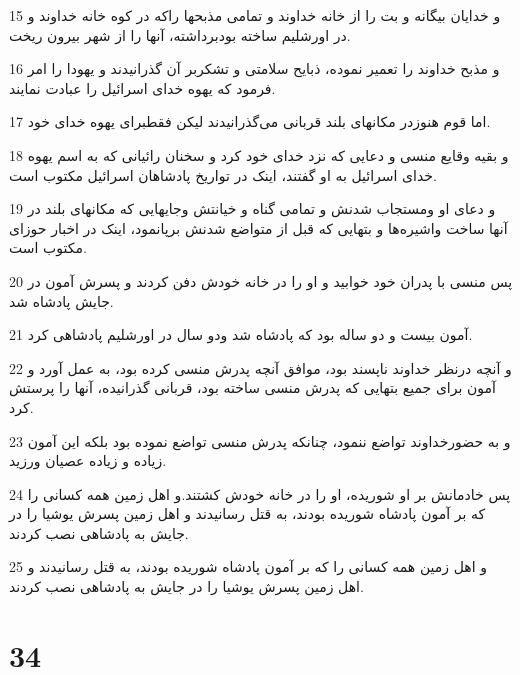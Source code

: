 \par 15 و خدایان بیگانه و بت را از خانه خداوند و تمامی مذبحها راکه در کوه خانه خداوند و در اورشلیم ساخته بودبرداشته، آنها را از شهر بیرون ریخت.
\par 16 و مذبح خداوند را تعمیر نموده، ذبایح سلامتی و تشکربر آن گذرانیدند و یهودا را امر فرمود که یهوه خدای اسرائیل را عبادت نمایند.
\par 17 اما قوم هنوزدر مکانهای بلند قربانی می‌گذرانیدند لیکن فقطبرای یهوه خدای خود.
\par 18 و بقیه وقایع منسی و دعایی که نزد خدای خود کرد و سخنان رائیانی که به اسم یهوه خدای اسرائیل به او گفتند، اینک در تواریخ پادشاهان اسرائیل مکتوب است.
\par 19 و دعای او ومستجاب شدنش و تمامی گناه و خیانتش وجایهایی که مکانهای بلند در آنها ساخت واشیره‌ها و بتهایی که قبل از متواضع شدنش برپانمود، اینک در اخبار حوزای مکتوب است.
\par 20 پس منسی با پدران خود خوابید و او را در خانه خودش دفن کردند و پسرش آمون در جایش پادشاه شد.
\par 21 آمون بیست و دو ساله بود که پادشاه شد ودو سال در اورشلیم پادشاهی کرد.
\par 22 و آنچه درنظر خداوند ناپسند بود، موافق آنچه پدرش منسی کرده بود، به عمل آورد و آمون برای جمیع بتهایی که پدرش منسی ساخته بود، قربانی گذرانیده، آنها را پرستش کرد.
\par 23 و به حضورخداوند تواضع ننمود، چنانکه پدرش منسی تواضع نموده بود بلکه این آمون زیاده و زیاده عصیان ورزید.
\par 24 پس خادمانش بر او شوریده، او را در خانه خودش کشتند.و اهل زمین همه کسانی را که بر آمون پادشاه شوریده بودند، به قتل رسانیدند و اهل زمین پسرش یوشیا را در جایش به پادشاهی نصب کردند.
\par 25 و اهل زمین همه کسانی را که بر آمون پادشاه شوریده بودند، به قتل رسانیدند و اهل زمین پسرش یوشیا را در جایش به پادشاهی نصب کردند.
 
\chapter{34}

